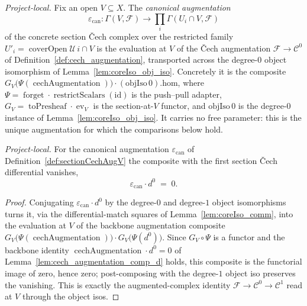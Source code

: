 \begin{definition}

  \label{def:sectionCechAugV}
  \textit{Project-local.}
  Fix an open \(V \subseteq X\). The \emph{canonical augmentation}
  \[
    \varepsilon_{\mathrm{can}} : \Gamma(V, \mathcal{F}) \longrightarrow
      \prod_i \Gamma(U_i \cap V, \mathcal{F})
  \]
  of the concrete section {\v C}ech complex over the restricted family
  \(U'_i = \operatorname{coverOpen}\mathcal{U}\,i \cap V\) is the evaluation at \(V\) of the {\v C}ech
  augmentation \(\mathcal{F} \to \mathcal{C}^0\) of Definition~\ref{def:cech_augmentation},
  transported across the degree-\(0\) object isomorphism of Lemma~\ref{lem:coreIso_obj_iso}.
  Concretely it is the composite
  \(G_V\bigl(\Psi(\operatorname{cechAugmentation})\bigr) \cdot (\mathrm{objIso}\,0).\mathrm{hom}\),
  where \(\Psi = \operatorname{forget}\cdot\operatorname{restrictScalars}(\mathrm{id})\) is the
  push--pull adapter, \(G_V = \operatorname{toPresheaf}\cdot\operatorname{ev}_V\) is the
  section-at-\(V\) functor, and \(\mathrm{objIso}\,0\) is the degree-\(0\) instance of
  Lemma~\ref{lem:coreIso_obj_iso}. It carries no free parameter: this is the unique augmentation
  for which the comparisons below hold.
\end{definition}

\begin{lemma}

  \label{lem:sectionCechAugV_comp_d}
  \textit{Project-local.}
  For the canonical augmentation \(\varepsilon_{\mathrm{can}}\) of
  Definition~\ref{def:sectionCechAugV} the composite with the first section {\v C}ech
  differential vanishes,
  \[
    \varepsilon_{\mathrm{can}} \cdot d^0 \;=\; 0.
  \]
\end{lemma}
\begin{proof}
  \leanok
  Conjugating \(\varepsilon_{\mathrm{can}} \cdot d^0\) by the degree-\(0\) and degree-\(1\) object
  isomorphisms turns it, via the differential-match squares of Lemma~\ref{lem:coreIso_comm}, into
  the evaluation at \(V\) of the backbone augmentation composite
  \(G_V\bigl(\Psi(\operatorname{cechAugmentation})\bigr) \cdot
  G_V\bigl(\Psi(d^0)\bigr)\). Since \(G_V\circ\Psi\) is a functor and the backbone identity
  \(\operatorname{cechAugmentation}\cdot d^0 = 0\) of Lemma~\ref{lem:cech_augmentation_comp_d}
  holds, this composite is the functorial image of zero, hence zero; post-composing with the
  degree-\(1\) object iso preserves the vanishing. This is exactly the augmented-complex identity
  \(\mathcal{F} \to \mathcal{C}^0 \to \mathcal{C}^1\) read at \(V\) through the object isos.
\end{proof}

